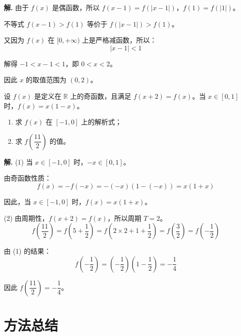 \documentclass[11pt]{ctexrep}
\begin{document}
\textbf{解.} 由于 $f(x)$ 是偶函数，所以 $f(x-1) = f(|x-1|)$，$f(1) = f(|1|)$。

不等式 $f(x-1) > f(1)$ 等价于 $f(|x-1|) > f(1)$。

又因为 $f(x)$ 在 $[0, +\infty)$ 上是严格减函数，所以：
\[
    |x-1| < 1
\]

解得 $-1 < x-1 < 1$，即 $0 < x < 2$。

因此 $x$ 的取值范围为 $(0, 2)$。

\begin{example}[奇偶性与周期性的综合]
    设 $f(x)$ 是定义在 $\mathbb{R}$ 上的奇函数，且满足 $f(x+2) = f(x)$。当 $x \in [0, 1]$ 时，$f(x) = x(1-x)$。
    \begin{enumerate}
        \item 求 $f(x)$ 在 $[-1, 0]$ 上的解析式；
        \item 求 $f\left(\dfrac{11}{2}\right)$ 的值。
    \end{enumerate}
\end{example}

\textbf{解.} (1) 当 $x \in [-1, 0]$ 时，$-x \in [0, 1]$。

由奇函数性质：
\[
    f(x) = -f(-x) = -(-x)(1-(-x)) = x(1+x)
\]

因此，当 $x \in [-1, 0]$ 时，$f(x) = x(1+x)$。

(2) 由周期性，$f(x+2) = f(x)$，所以周期 $T = 2$。
\[
    f\left(\frac{11}{2}\right) = f\left(5 + \frac{1}{2}\right) = f\left(2 \times 2 + 1 + \frac{1}{2}\right) = f\left(\frac{3}{2}\right) = f\left(-\frac{1}{2}\right)
\]

由 (1) 的结果：
\[
    f\left(-\frac{1}{2}\right) = \left(-\frac{1}{2}\right)\left(1-\frac{1}{2}\right) = -\frac{1}{4}
\]

因此 $f\left(\dfrac{11}{2}\right) = -\dfrac{1}{4}$。

\section*{方法总结}
\end{document}
